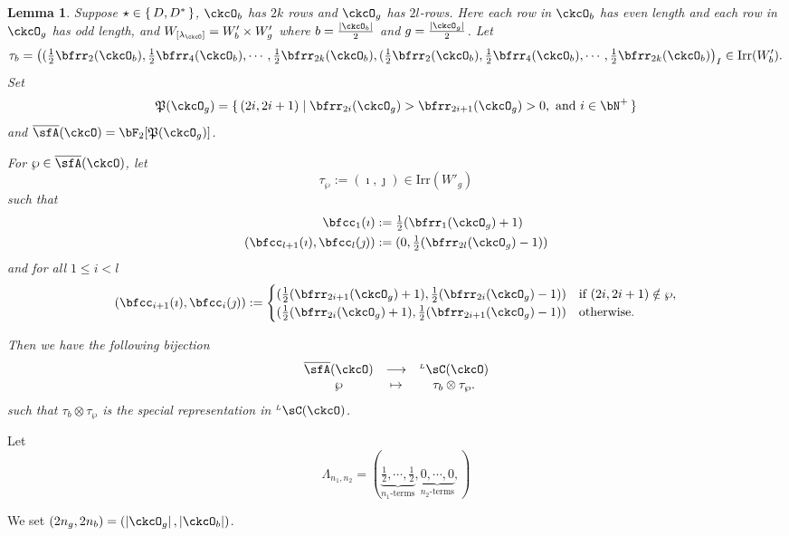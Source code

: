 \documentclass[12pt,a4paper]{amsart}
\def\abs#1{\left|{#1}\right|}
\newcommand{\CQ}{{\mathcal {Q}}}
\numberwithin{equation}{section}
\newtheorem{lem}[thm]{Lemma}
\theoremstyle{remark}
\def\half{{\tfrac{1}{2}}}
\def\Irr{\mathrm{Irr}}
\def\WLamck{W_{[\lambda_{\ckcO}]}}
\def\LC{{}^{\scriptscriptstyle L}\sC}
\def\CQ{\overline{\sfA}}%
\def\CPP{\mathfrak{P}}
\begin{document}
\begin{lem}
  Suppose $\star \in \set{D, D^{*}}$, $\ckcO_{b}$ has $2k$ rows and $\ckcO_{g}$
  has $2l$-rows. Here each row in $\ckcO_{b}$ has even length and each row in
  $\ckcO_{g}$ has odd length, and $\WLamck = W'_{b}\times W'_{g}$ where
  $b= \frac{\abs{\ckcO_{b}}}{2}$ and $g = \frac{\abs{\ckcO_{g}}}{2}$. Let
  \[
    \tau_{b} = \left( (\half\bfrr_{2}(\ckcO_{b}), \half\bfrr_{4}(\ckcO_{b}),\cdots, \half\bfrr_{2k}(\ckcO_{b}), (\half\bfrr_{2}(\ckcO_{b}), \half\bfrr_{4}(\ckcO_{b}),\cdots, \half\bfrr_{2k}(\ckcO_{b}) \right)_{I}\in \Irr(W'_{b}).
  \]
  Set
  \[
    \CPP(\ckcO_{g}) = \set{(2i,2i+1)| \bfrr_{2i}(\ckcO_{g})> \bfrr_{2i+1}(\ckcO_{g})>0, \text{
        and } i\in \bN^{+}}
  \]
  and $\CQ(\ckcO)= \bF_{2}[\CPP(\ckcO_{g})]$.

  For $\wp \in \CQ(\ckcO)$, let
  \[
    \tau_{\wp} := (\imath,\jmath) \in \Irr(W'_{g})
  \]
  such that
  \[
    \begin{split}
      \bfcc_{1}(\imath)  &:= \half(\bfrr_{1}(\ckcO_{g})+1)\\
      (\bfcc_{l+1}(\imath), \bfcc_{l}(\jmath))  &:= (0,\half(\bfrr_{2l}(\ckcO_{g})-1))
    \end{split}
  \]
  and for all $1\leq i< l$
  \[
  (\bfcc_{i+1}(\imath), \bfcc_{i}(\jmath)):=
  \begin{cases}
    (\half (\bfrr_{2i+1}(\ckcO_{g})+1),
    \half (\bfrr_{2i}(\ckcO_{g})-1))
    & \text{if } (2i,2i+1)\notin \wp,\\
    (\half (\bfrr_{2i}(\ckcO_{g})+1),\half (\bfrr_{2i+1}(\ckcO_{g})-1)) & \text{otherwise.}
  \end{cases}
  \]

  Then we have the following bijection
  \[
    \begin{array}{ccc}
      \CQ(\ckcO) &\longrightarrow & \LC(\ckcO)\\
      \wp & \mapsto & \tau_{b}\otimes \tau_{\wp}.
    \end{array}
  \]
  such that $\tau_{b}\otimes \tau_{\wp}$ is the special representation in
  $\LC(\ckcO)$.
\end{lem}

Let \[
  \Lambda_{n_{1}, n_{2}} = (\underbrace{\half,\cdots,\half}_{n_{1}\text{-terms}}, \underbrace{0,\cdots,0}_{n_{2}\text{-terms}}, )
\]

We set $(2n_{g},2n_{b}) = (\abs{\ckcO_g},\abs{\ckcO_b})$.
\end{document}

